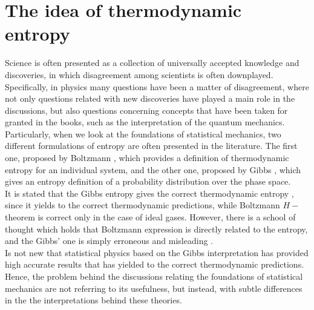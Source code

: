 \section{The idea of thermodynamic entropy}
Science is often presented as a collection of universally accepted knowledge and discoveries, in which disagreement among scientists is often downplayed.
Specifically, in physics many questions have been a matter of disagreement, where not only questions related with new discoveries have played a main role in the discussions, but also questions concerning concepts that have been taken for granted in the books, such as the interpretation of the quantum mechanics. Particularly, when we look at the foundations of statistical mechanics, two different formulations of entropy are often presented in the literature. The first one, proposed by Boltzmann \cite{boltzmann1871prioritat}, which provides a definition of thermodynamic entropy for an individual system, and the other one, proposed by Gibbs \cite{gibbs_elementary_1902}, which gives an entropy definition of a probability distribution over the phase space.\\

\indent It is stated that the Gibbs entropy gives the correct thermodynamic entropy \cite{lr_statistical_1963}, since it yields to the correct thermodynamic predictions, while Boltzmann $H-$theorem is correct only in the case of ideal gases. However, there is a school of thought which holds that Boltzmann expression is directly related to the entropy, and the Gibbs' one is simply erroneous and misleading \cite{ehrenfest_conceptual_1959}.\\
\indent Is not new that statistical physics based on the Gibbs interpretation has provided high accurate results that has yielded to the correct thermodynamic predictions. Hence, the problem behind the discussions relating the foundations of statistical mechanics are not referring to its usefulness, but instead, with subtle differences in the the interpretations behind these theories.
